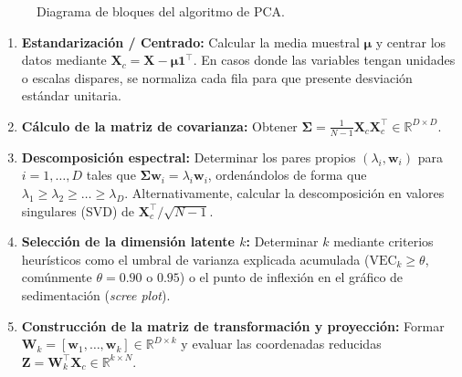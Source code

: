 \documentclass[11pt,letterpaper]{article}
\begin{document}
	\begin{figure}[h!]
		\centering
		\caption{Diagrama de bloques del algoritmo de PCA.}
		\label{fig:algoritmo}
	\end{figure}
	
	\begin{enumerate}[itemsep=4pt]
		\item \textbf{Estandarización / Centrado:} Calcular la media muestral $\boldsymbol{\mu}$ y centrar los datos mediante $\mathbf{X}_c = \mathbf{X} - \boldsymbol{\mu}\mathbf{1}^\top$. En casos donde las variables tengan unidades o escalas dispares, se normaliza cada fila para que presente desviación estándar unitaria.
		\item \textbf{Cálculo de la matriz de covarianza:} Obtener $\boldsymbol{\Sigma} = \frac{1}{N-1}\mathbf{X}_c\mathbf{X}_c^\top \in \mathbb{R}^{D \times D}$.
		\item \textbf{Descomposición espectral:} Determinar los pares propios $(\lambda_i, \mathbf{w}_i)$ para $i=1,\dots,D$ tales que $\boldsymbol{\Sigma}\mathbf{w}_i = \lambda_i\mathbf{w}_i$, ordenándolos de forma que $\lambda_1 \ge \lambda_2 \ge \dots \ge \lambda_D$. Alternativamente, calcular la descomposición en valores singulares (SVD) de $\mathbf{X}_c^\top / \sqrt{N-1}$.
		\item \textbf{Selección de la dimensión latente $k$:} Determinar $k$ mediante criterios heurísticos como el umbral de varianza explicada acumulada ($\text{VEC}_k \ge \theta$, comúnmente $\theta = 0.90$ o $0.95$) o el punto de inflexión en el gráfico de sedimentación (\emph{scree plot}).
		\item \textbf{Construcción de la matriz de transformación y proyección:} Formar $\mathbf{W}_k = [\mathbf{w}_1, \dots, \mathbf{w}_k] \in \mathbb{R}^{D \times k}$ y evaluar las coordenadas reducidas $\mathbf{Z} = \mathbf{W}_k^\top \mathbf{X}_c \in \mathbb{R}^{k \times N}$.
	\end{enumerate}
	
\end{document}

